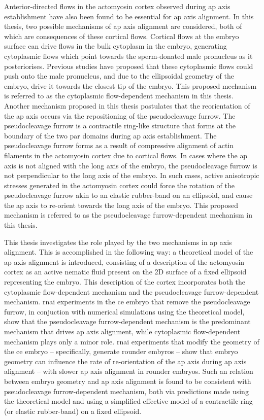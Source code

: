 Anterior-directed flows in the actomyosin cortex observed during \acs{ap} axis establishment have also been found to be essential for \acs{ap} axis alignment. In this thesis, two possible mechanisms of \acs{ap} axis alignment are considered, both of which are consequences of these cortical flows. Cortical flows at the embryo surface can drive flows in the bulk cytoplasm in the embryo, generating cytoplasmic flows which point towards the sperm-donated male pronucleus as it posteriorises. Previous studies have proposed that these cytoplasmic flows could push onto the male pronucleus, and due to the ellipsoidal geometry of the embryo, drive it towards the closest tip of the embryo. This proposed mechanism is referred to as the cytoplasmic flow-dependent mechanism in this thesis. Another mechanism proposed in this thesis postulates that the reorientation of the \acs{ap} axis occurs via the repositioning of the pseudocleavage furrow. The pseudocleavage furrow is a contractile ring-like structure that forms at the boundary of the two \acs{par} domains during \acs{ap} axis establishment. The pseudocleavage furrow forms as a result of compressive alignment of actin filaments in the actomyosin cortex due to cortical flows. In cases where the \acs{ap} axis is not aligned with the long axis of the embryo, the pseudocleavage furrow is
not perpendicular to the long axis of the embryo. In such cases, active anisotropic stresses generated in the actomyosin cortex could force the rotation of the pseudocleavage furrow akin to an elastic rubber-band on an ellipsoid, and cause the \ac{ap} axis to re-orient towards the long axis of the embryo. This proposed mechanism is referred to as the pseudocleavage furrow-dependent mechanism in this thesis.

This thesis investigates the role played by the two mechanisms in \acs{ap} axis alignment. This is accomplished in the following way: a theoretical model of the \acs{ap} axis alignment is introduced, consisting of a description of the actomyosin cortex as an active nematic fluid present on the 2D surface of a fixed ellipsoid representing the embryo. This description of the cortex incorporates both the cytoplasmic flow-dependent mechanism and the pseudocleavage furrow-dependent mechanism. \acs{rnai} experiments in the \acs{ce} embryo that remove the pseudocleavage furrow, in conjuction with numerical simulations using the theoretical model, show that the pseudocleavage furrow-dependent mechanism is the predominant mechanism that drives \acs{ap} axis alignment, while cytoplasmic flow-dependent mechanism plays only a minor role. \acs{rnai} experiments that modify the geometry of the \acs{ce} embryo -- specifically, generate rounder embyros -- show that embryo geometry can influence the rate of re-orientation of the \acs{ap} axis during \acs{ap} axis alignment -- with slower \acs{ap} axis alignment in rounder embryos. Such an relation between embryo geometry and \acs{ap} axis alignment is found to be consistent with pseudocleavage furrow-dependent mechanism, both via predictions made using the theoretical model and using a simplified effective model of a contractile ring (or elastic rubber-band) on a fixed ellipsoid. 

